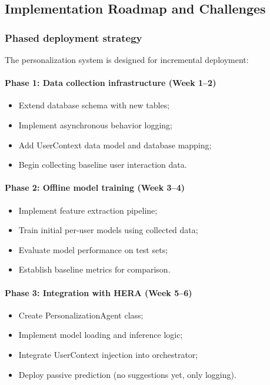 \subsection{Implementation Roadmap and Challenges}
\label{sec:implementation-roadmap}

\subsubsection{Phased deployment strategy}

The personalization system is designed for incremental deployment:

\paragraph{Phase 1: Data collection infrastructure (Week 1--2)}
\begin{itemize}
    \item Extend database schema with new tables;
    \item Implement asynchronous behavior logging;
    \item Add UserContext data model and database mapping;
    \item Begin collecting baseline user interaction data.
\end{itemize}

\paragraph{Phase 2: Offline model training (Week 3--4)}
\begin{itemize}
    \item Implement feature extraction pipeline;
    \item Train initial per-user models using collected data;
    \item Evaluate model performance on test sets;
    \item Establish baseline metrics for comparison.
\end{itemize}

\paragraph{Phase 3: Integration with HERA (Week 5--6)}
\begin{itemize}
    \item Create PersonalizationAgent class;
    \item Implement model loading and inference logic;
    \item Integrate UserContext injection into orchestrator;
    \item Deploy passive prediction (no suggestions yet, only logging).
\end{itemize}

